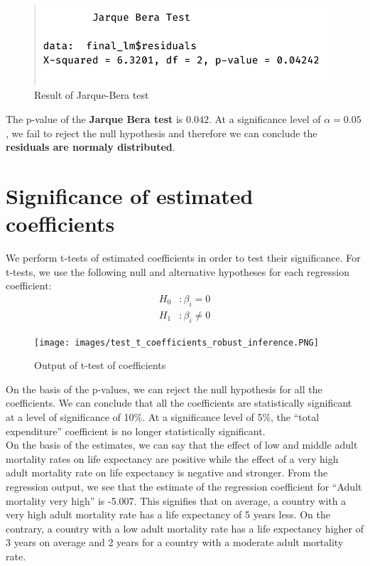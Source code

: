 \begin{figure}[H]
	\centering
	\includegraphics{figures/models/jarque-bera_test.png}
	\caption{Result of Jarque-Bera test}
	\label{fig:jarque-bera-test}
\end{figure}

The p-value of the \textbf{Jarque Bera test} is $0.042$. At a significance level of $\alpha = 0.05$, we fail to reject the null hypothesis and therefore we can conclude the \textbf{residuals are normaly distributed}. 

\section{Significance of estimated coefficients}

We perform t-tests of estimated coefficients in order to test their significance. For t-tests, we use the following null and alternative hypotheses for each regression coefficient: 
\begin{align*}
	H_0&: \beta_i = 0 \\
	H_1&: \beta_i \neq 0
\end{align*}

\begin{figure}[H]
	\centering
	\texttt{[image: images/test\_t\_coefficients\_robust\_inference.PNG]}
	\caption{Output of t-test of coefficients}
\end{figure}

On the basis of the p-values, we can reject the null hypothesis for all the coefficients. We can conclude that all the coefficients are statistically significant at a level of significance of 10\%. At a significance level of 5\%, the “total expenditure” coefficient is no longer statistically significant. \\

On the basis of the estimates, we can say that the effect of low and middle adult mortality rates on life expectancy are positive while the effect of a very high adult mortality rate on life expectancy is negative and stronger. From the regression output, we see that the estimate of the regression coefficient for “Adult mortality very high” is -5.007. This signifies that on average, a country with a very high adult mortality rate has a life expectancy of 5 years less. On the contrary, a country with a low  adult mortality rate has a life expectancy higher of 3 years on average and 2 years for a country with a moderate adult mortality rate. 

